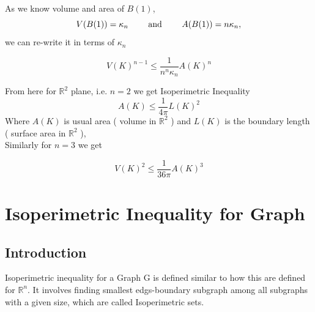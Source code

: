\documentclass[oneside]{book}
\begin{document}
	As we know volume and area of $B(1)$, 
	$$V(B(1))=\kappa_{n} \text{  \quad \quad and \quad \quad   } A(B(1))=n \kappa_{n},$$
	we can re-write it  in terms of $\kappa_{n}$
	
	\[
	V(K)^{n-1} \leq \frac{1}{n^{n} \kappa_{n}} A(K)^{n}
	\]
	\hfill \break
	
	From here for $\mathbb{R}^{2}$ plane, i.e. $n=2$ we get Isoperimetric Inequality  
	\[
	A(K) \leq \frac{1}{4 \pi} L(K)^{2}
	\]
	Where  $A(K)$ is usual  area ( volume in $\mathbb{R}^{2}$ ) and $L(K)$ is the boundary length \newline  ( surface area in $\mathbb{R}^{2}$ ), \\
	
	Similarly  for $n=3$
	we get
	
	\[
	V(K)^{2} \leq \frac{1}{36 \pi} A(K)^{3}
	\]
	
	
	
	
	
	
	
	
	
	
	
	\chapter{Isoperimetric Inequality for Graph}
	\label{chap:c5}
	\section{Introduction}
	\label{s:5}
	
	
	
	
	
	
	
	
	Isoperimetric inequality for a Graph G is defined similar to how this are defined for $\mathbb{R}^n$. It involves finding smallest edgs-boundary subgraph among all subgraphs with a given size, which are called Isoperimetric sets.  
	\hfill \break
	
\end{document}
